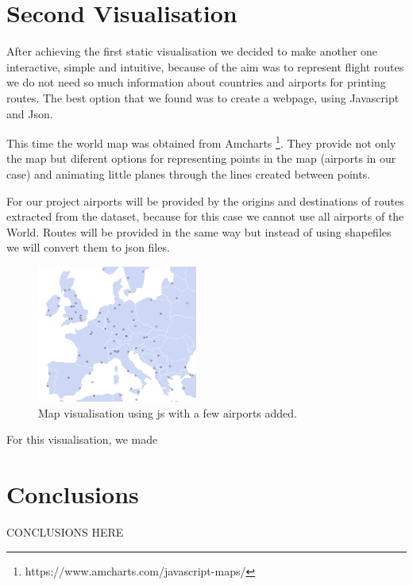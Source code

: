 \documentclass{vldb}
\begin{document}
\section{Second Visualisation}
After achieving the first static visualisation we decided to make 
another one interactive, simple and intuitive, because of the aim was to 
represent flight routes we do not need so much information 
about countries and airports for printing routes. 
The best option that we found was to create a webpage, using Javascript and Json. 

This time the world map was obtained from 
Amcharts \footnote{https://www.amcharts.com/javascript-maps/}. 
They provide not only the map but diferent options for representing 
points in the map (airports in our case) and animating 
little planes through the lines created between points. 

For our project airports will be provided by the origins and 
destinations of routes extracted from the dataset, because 
for this case we cannot use all airports of the World. 
Routes will be provided in the same way but instead of using shapefiles we will convert them to json files.

\begin{figure}
\centering
\includegraphics[width=0.47\textwidth]{js_Europe_center_few_airports}
\caption{Map visualisation using js with a few airports added.}
\label{fig:js_Europe_center_few_airportsi}
\end{figure}

For this visualisation, we made 


\section{Conclusions}
CONCLUSIONS HERE

\balance
\end{document}
